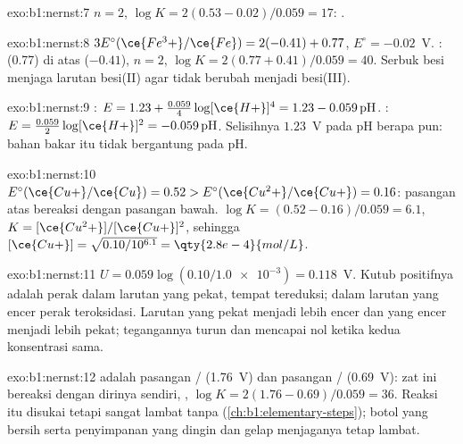 \begin{solution}{exo:b1:nernst:7}
$n = 2$, $\log K = 2(0.53 - 0.02)/0.059 = 17$: .
\end{solution}

\begin{solution}{exo:b1:nernst:8}
$3E^\circ(\ce{Fe^3+}/\ce{Fe}) = 2(-0.41) + 0.77$, $E^\circ = -0.02$~V.
:   (0.77) di atas 
 ($-0.41$), $n = 2$, $\log K = 2(0.77 + 0.41)/0.059 = 40$. Serbuk
besi menjaga larutan besi(II) agar tidak berubah menjadi besi(III).
\end{solution}

\begin{solution}{exo:b1:nernst:9}
: $E = 1.23 + \frac{0.059}{4}\log [\ce{H+}]^4 =
1.23 - 0.059\,\mathrm{pH}$. : $E = \frac{0.059}{2}\log
[\ce{H+}]^2 = -0.059\,\mathrm{pH}$. Selisihnya $1.23$~V pada pH berapa pun:
 bahan bakar itu tidak bergantung pada pH.
\end{solution}

\begin{solution}{exo:b1:nernst:10}
$E^\circ(\ce{Cu+}/\ce{Cu}) = 0.52 > E^\circ(\ce{Cu^2+}/\ce{Cu+}) = 0.16$:
  pasangan atas bereaksi dengan  
pasangan bawah. $\log K = (0.52 - 0.16)/0.059 = 6.1$, $K =
[\ce{Cu^2+}]/[\ce{Cu+}]^2$, sehingga $[\ce{Cu+}] = \sqrt{0.10/10^{6.1}} =
\qty{2.8e-4}{mol/L}$.
\end{solution}

\begin{solution}{exo:b1:nernst:11}
$U = 0.059\log(0.10/\num{1.0e-3}) = 0.118$~V. Kutub positifnya adalah
perak dalam larutan yang pekat, tempat  tereduksi; dalam larutan
yang encer perak teroksidasi. Larutan yang pekat menjadi lebih encer dan
yang encer menjadi lebih pekat; tegangannya turun dan mencapai nol ketika
kedua konsentrasi sama.
\end{solution}

\begin{solution}{exo:b1:nernst:12}
 adalah  pasangan / (1.76~V) dan
 pasangan / (0.69~V): zat ini bereaksi dengan
dirinya sendiri, ,
$\log K = 2(1.76 - 0.69)/0.059 = 36$. Reaksi itu disukai tetapi sangat
lambat tanpa  (\cref{ch:b1:elementary-steps}); botol yang bersih
serta penyimpanan yang dingin dan gelap menjaganya tetap lambat.
\end{solution}

